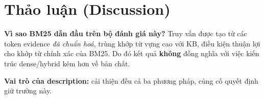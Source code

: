 
\section{Thảo luận (Discussion)}
\label{sec:thaoluan}

\textbf{Vì sao BM25 dẫn đầu trên bộ đánh giá này?} Truy vấn được tạo từ các token evidence \textit{đã chuẩn hoá}, trùng khớp từ vựng cao với KB, điều kiện thuận lợi cho khớp từ chính xác của BM25. Do đó kết quả \textbf{không} đồng nghĩa với việc kiến trúc dense/hybrid kém hơn về bản chất.

\textbf{Vai trò của description:} cải thiện đều cả ba phương pháp, củng cố quyết định giữ trường này.

